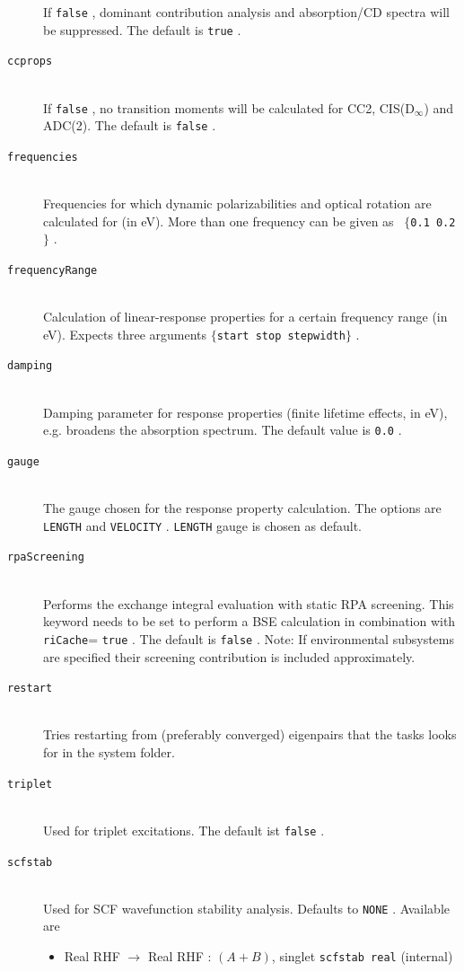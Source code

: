 \documentclass[bibliography=totocnumbered,a4paper,10pt,oneside]{scrbook}
\newcommand{\ttt}[1]{%
  \begingroup\setlength{\fboxsep}{1pt}%
  \colorbox{serenity-green!30}{\texttt{\hspace*{2pt}\vphantom{(g}#1\hspace*{2pt}}}%
  \endgroup
}
\begin{document}
\begin{description}
    If \ttt{false}, dominant contribution analysis and absorption/CD spectra will be suppressed. The default is \ttt{true}.
    \item [\texttt{ccprops}]\hfill \\
    If \ttt{false}, no transition moments will be calculated for CC2, CIS(D$_\infty$) and ADC(2). The default is \ttt{false}.
    \item [\texttt{frequencies}]\hfill \\
    Frequencies for which dynamic polarizabilities and optical rotation are calculated for (in eV). More than one frequency can be given as~\ttt{$\{$0.1 0.2$\}$}.
    \item [\texttt{frequencyRange}]\hfill \\
    Calculation of linear-response properties for a certain frequency range (in eV). Expects three arguments \ttt{$\{$start stop stepwidth$\}$}.
    \item [\texttt{damping}]\hfill \\
    Damping parameter for response properties (finite lifetime effects, in eV), e.g. broadens the absorption spectrum. The default value is \ttt{0.0}.
    \item [\texttt{gauge}]\hfill \\
    The gauge chosen for the response property calculation. The options are \ttt{LENGTH} and \ttt{VELOCITY}. \ttt{LENGTH} gauge is chosen as default.
    \item [\texttt{rpaScreening}]\hfill \\
    Performs the exchange integral evaluation with static RPA screening. This keyword needs to be set to perform a BSE calculation in combination with \texttt{riCache}=\ttt{true}. The default is \ttt{false}. Note: If environmental subsystems are specified their screening contribution is included approximately. 
    \item [\texttt{restart}]\hfill \\
    Tries restarting from (preferably converged) eigenpairs that the tasks
    looks for in the system folder.
    \item [\texttt{triplet}]\hfill \\
    Used for triplet excitations. The default ist \ttt{false}.
    \item [\texttt{scfstab}]\hfill \\
    Used for SCF wavefunction stability analysis. Defaults to \ttt{NONE}. Available are
    \begin{itemize}
      \item Real RHF $\rightarrow$ Real RHF    : $(A+B)$, singlet \ttt{scfstab real} (internal)

\end{itemize}
\end{description}
\end{document}
